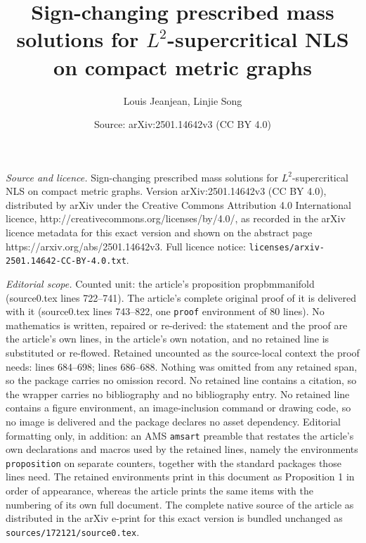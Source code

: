 \documentclass[10pt,a4paper]{amsart}
\title{Sign-changing prescribed mass solutions for $L^2$-supercritical NLS on compact metric graphs}
\author{Louis Jeanjean, Linjie Song}
\date{Source: arXiv:2501.14642v3 (CC BY 4.0)}
\begin{document}
\maketitle

\noindent\emph{Source and licence.} Sign-changing prescribed mass solutions for $L^2$-supercritical NLS on compact metric graphs. Version arXiv:2501.14642v3 (CC BY 4.0), distributed by arXiv under the Creative Commons Attribution 4.0 International licence, http://creativecommons.org/licenses/by/4.0/, as recorded in the arXiv licence metadata for this exact version and shown on the abstract page https://arxiv.org/abs/2501.14642v3. Full licence notice: \texttt{licenses/arxiv-2501.14642-CC-BY-4.0.txt}.\par\smallskip

\noindent\textit{Editorial scope.} Counted unit: the article's proposition propbmmanifold (source0.tex lines 722--741). The article's complete original proof of it is delivered with it (source0.tex lines 743--822, one \texttt{proof} environment of 80 lines). No mathematics is written, repaired or re-derived: the statement and the proof are the article's own lines, in the article's own notation, and no retained line is substituted or re-flowed.  Retained uncounted as the source-local context the proof needs: lines 684--698; lines 686--688.  Nothing was omitted from any retained span, so the package carries no omission record.  No retained line contains a citation, so the wrapper carries no bibliography and no bibliography entry.  No retained line contains a figure environment, an image-inclusion command or drawing code, so no image is delivered and the package declares no asset dependency.  Editorial formatting only, in addition: an AMS \texttt{amsart} preamble that restates the article's own declarations and macros used by the retained lines, namely the environments \texttt{proposition} on separate counters, together with the standard packages those lines need.  The retained environments print in this document as Proposition 1 in order of appearance, whereas the article prints the same items with the numbering of its own full document.  The complete native source of the article as distributed in the arXiv e-print for this exact version is bundled unchanged as \texttt{sources/172121/source0.tex}.
\end{document}
